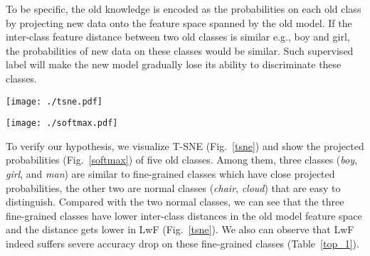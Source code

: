 \documentclass[10pt,twocolumn,letterpaper]{article}
\begin{document}
To be specific, the old knowledge is encoded as the probabilities on each old class by projecting new data onto the feature space spanned by the old model. If the inter-class feature distance between two old classes is similar e.g., boy and girl, the probabilities of new data on these classes would be similar. Such supervised label will make the new model gradually lose its ability to discriminate these classes. 
\begin{table*}[t]
 \begin{minipage}{0.65\linewidth}
  \centering
  \texttt{[image: ./tsne.pdf]}
  \label{tsne}
 \end{minipage}
 \hfill
  \begin{minipage}{0.32\linewidth}
  \centering
  \texttt{[image: ./softmax.pdf]}
  \label{softmax}
 \end{minipage}
 \hfill
 \vspace{-3mm}
\end{table*}

To verify our hypothesis, we visualize T-SNE (Fig.~\ref{tsne}) and show the projected probabilities (Fig.~\ref{softmax}) of five old classes. Among them, three classes (\emph{boy}, \emph{girl}, and \emph{man}) are similar to fine-grained classes which have close projected probabilities, the other two are normal classes (\emph{chair}, \emph{cloud}) that are easy to distinguish.
Compared with the two normal classes, we can see that the three fine-grained classes have lower inter-class distances in the old model feature space and the distance gets lower in LwF (Fig.~\ref{tsne}). We also can observe that LwF indeed suffers severe accuracy drop on these fine-grained classes (Table~\ref{top_1}).
\end{document}
